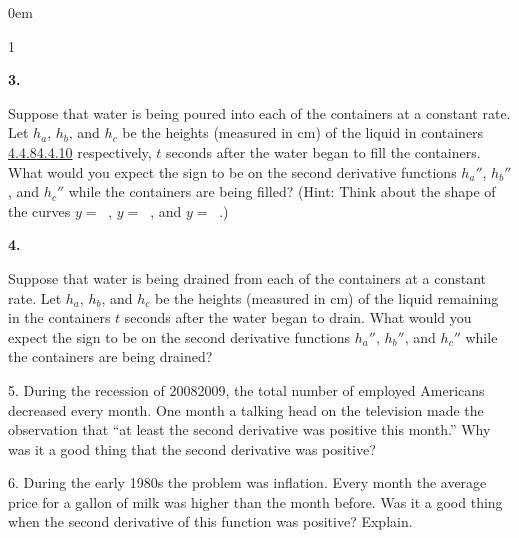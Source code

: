 \documentclass[12pt,]{book}
\theoremstyle{plain}
\theoremstyle{definition}
\numberwithin{equation}{section}
\newenvironment{exercisegroup}%
{\medskip\noindent}%
{\par\bigskip}%
\newlength{\exercisegroupindent}%
\newlength{\exercisegroupitemwidth}%
\newenvironment{exercisegrouplist}%
{\vspace{-\partopsep}%
\begin{adjustwidth}{\exercisegroupindent}{0em}}%
{\end{adjustwidth}%
\vspace{-\partopsep}%
\vspace{\baselineskip}}%
\newenvironment{exercisegroupbycol}[1]%
{\begin{exercisegrouplist}%
\vspace{-\multicolsep}%
\begin{multicols}{#1}%
\setlength{\parindent}{0em}%
\setlength{\exercisegroupitemwidth}{\linewidth}}%
{\end{multicols}%
\vspace{-\multicolsep}%
\end{exercisegrouplist}}%
\newenvironment{exercisegroupitem}[1]%
{\begin{minipage}[t]{\exercisegroupitemwidth}
\vspace{0pt}%
{\bfseries#1}%
\rule{0pt}{\baselineskip}}{\strut%
\end{minipage}%
\hspace{\columnsep}}%
\providecommand\phantomsection{}
\newcommand{\fe}[2]{\mathop{{#1}{\left(#2\right)}}}
\newcommand{\sd}[1]{#1''}
\begin{document}
\begin{exerciselist}
\begin{exercisegroup}
\begin{exercisegroupbycol}{1}
\begin{exercisegroupitem}{3. }\phantomsection\hypertarget{exercise-180}{\null}
Suppose that water is being poured into each  of the containers at a constant rate.  Let \(h_a\), \(h_b\), and \(h_c\) be the heights (measured in \si{\centi\meter}) of the liquid in containers \hyperref[figure-prism-uniform]{4.4.8}\textendash{}\hyperref[figure-prism-bottom-heavy]{4.4.10} respectively, \(t\) seconds after the water began to fill the containers.  What would you expect the sign to be on the second derivative functions \(\sd{h_a}\), \(\sd{h_b}\), and \(\sd{h_c}\) while the containers are being filled?  (Hint:  Think about the shape of the curves \(y=\fe{\sd{h_a}}{t}\), \(y=\fe{\sd{h_b}}{t}\), and \(y=\fe{\sd{h_c}}{t}\).)%
\end{exercisegroupitem}%
\par%
\begin{exercisegroupitem}{4. }\phantomsection\hypertarget{exercise-181}{\null}
Suppose that water is being drained from each  of the containers at a constant rate.  Let \(h_a\), \(h_b\), and \(h_c\) be the heights (measured in \si{\centi\meter}) of the liquid remaining in the containers \(t\) seconds after the water began to drain.  What would you expect the sign to be on the second derivative functions \(\sd{h_a}\), \(\sd{h_b}\), and \(\sd{h_c}\)  while the containers are being drained?%
\end{exercisegroupitem}%
\par%
\end{exercisegroupbycol}%
\end{exercisegroup}%
\item[5.]\phantomsection\hypertarget{exercise-182}{\null}During the recession of 2008\textendash{}2009, the total number of employed Americans decreased every month.  One month a talking head on the television made the observation that ``at least the second derivative was positive this month.''  Why was it a good thing that the second derivative was positive?%
\par\smallskip
\item[6.]\phantomsection\hypertarget{exercise-183}{\null}During the early 1980s the problem was inflation. Every month the average price for a gallon of milk was higher than the month before.  Was it a good thing when the second derivative of this function was positive?  Explain.%
\par\smallskip
\end{exerciselist}
\typeout{************************************************}
\typeout{************************************************}
\end{document}
